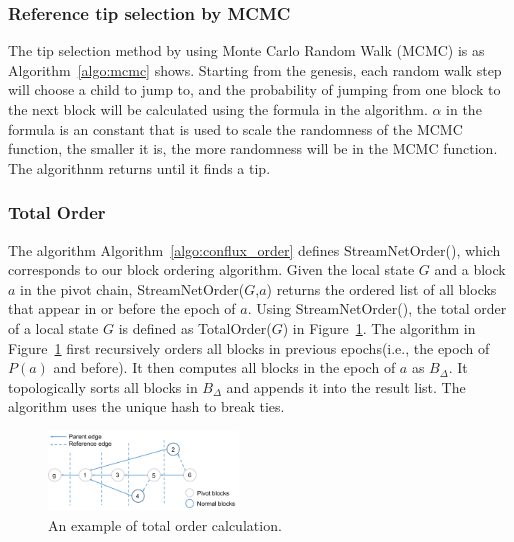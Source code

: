 

\subsubsection{Reference tip selection by MCMC} 

The tip selection method by using Monte Carlo Random Walk (MCMC) is as Algorithm~\ref{algo:mcmc} shows.
Starting from the genesis, each random walk step will choose a child to jump to,
and the probability of jumping from one block to the next block will be calculated using the formula in the algorithm.
$\alpha$ in the formula is an constant that is used to scale the randomness of the MCMC function, the smaller it is, the more randomness will be in the MCMC function.
The algorithnm returns until it finds a tip.

\subsubsection{Total Order} 
The algorithm Algorithm~\ref{algo:conflux_order} defines StreamNetOrder(), 
which corresponds to our block ordering algorithm. 
Given the local state $G$ and a block $a$ in the pivot chain, 
StreamNetOrder($G$,$a$) returns the ordered list of all blocks that appear in or before the epoch of $a$. 
Using StreamNetOrder(), the total order of a local state $G$ is defined as TotalOrder($G$) in Figure~\ref{total_order}. 
The algorithm in Figure~\ref{total_order}  first recursively orders all blocks in previous epochs(i.e., the epoch of $P(a)$ and before). 
It then computes all blocks in the epoch of $a$ as $B_\Delta$. 
It topologically sorts all blocks in $B_\Delta$ and appends it into the result list. 
The algorithm uses the unique hash to break ties. 



\begin{figure}[!ht]
\begin{center}
\includegraphics[width=0.45\textwidth]{figures/total_order.pdf}
    \caption{
        An example of total order calculation.
     }
\label{total_order}
\end{center}
\end{figure}

